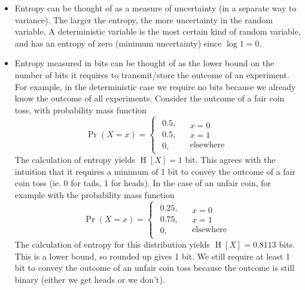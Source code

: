 \documentclass[11pt]{report} %
\begin{document}
\begin{itemize}
\item Entropy can be thought of as a measure of uncertainty (in a separate way to variance). The larger the entropy, the more uncertainty in the random variable. A deterministic variable is the most certain kind of random variable, and has an entropy of zero (minimum uncertainty) since $\log 1 = 0$.
\item Entropy measured in bits can be thought of as the lower bound on the number of bits it requires to transmit/store the outcome of an experiment. For example, in the deterministic case we require no bits because we already know the outcome of all experiments. Consider the outcome of a fair coin toss, with probability mass function
\begin{equation}
\operatorname{Pr}\left(X = x\right) = \begin{cases}
\begin{array}{c}
0.5,\\
0.5,\\
0,
\end{array} & \begin{array}{c}
x=0\\
x=1\\
\text{elsewhere}
\end{array}\end{cases}
\end{equation}
The calculation of entropy yields $\operatorname{H}\left[X\right] = 1$ bit. This agrees with the intuition that it requires a minimum of 1 bit to convey the outcome of a fair coin toss (ie. 0 for tails, 1 for heads). In the case of an unfair coin, for example with the probability mass function
\begin{equation}
\operatorname{Pr}\left(X = x\right) = \begin{cases}
\begin{array}{c}
0.25,\\
0.75,\\
0,
\end{array} & \begin{array}{c}
x=0\\
x=1\\
\text{elsewhere}
\end{array}\end{cases}
\end{equation}
The calculation of entropy for this distribution yields $\operatorname{H}\left[X\right] = 0.8113$ bits. This is a lower bound, so rounded up gives 1 bit. We still require at least 1 bit to convey the outcome of an unfair coin toss because the outcome is still binary (either we get heads or we don't). \\


\end{itemize}
\end{document}

